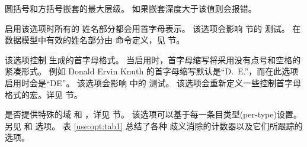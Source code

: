 \begin{optionlist}

圆括号和方括号嵌套的最大层级。
如果嵌套深度大于该值则会报错。



启用该选项时所有的  姓名部分都会用首字母表示。
该选项会影响  节的  测试。
在数据模型中有效的姓名部分由  命令定义，见  节。



该选项控制 \biblatex 生成的首字母格式。
当启用时，首字母缩写将采用没有点号和空格的紧凑形式。
例如 Donald Ervin Knuth 的首字母缩写默认是“D.~E.”，而在此选项启用时会是“DE”。
该选项会影响  中的  测试。
该选项会重新定义一些控制首字母格式的宏。详见  节。



是否提供特殊的域  和 ，详见  节。
该选项可以基于每一条目类型(per-type)设置。
另见  和  选项。
表 \ref{use:opt:tab1} 总结了各种  歧义消除的计数器以及它们所跟踪的选项。


\end{optionlist}

